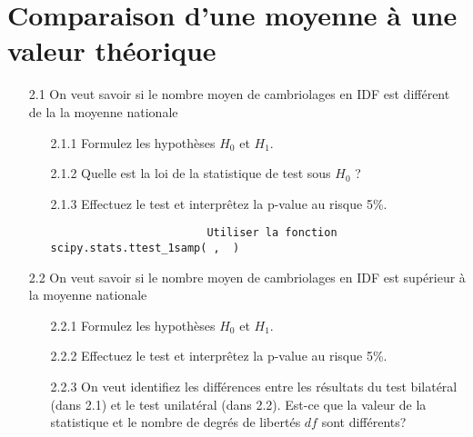 \documentclass[11pt,a4paper]{article}
\begin{document}
		\section{Comparaison d'une moyenne \`a une valeur th\'eorique}
			\begin{enumerate}
				\item[2.1] On veut savoir si le  nombre moyen de  cambriolages en IDF est diff\'erent 
				 de la la moyenne nationale
				
				\begin{itemize}
				\item [2.1.1] Formulez les hypothèses $H_0$ et $H_1$.
				\item [2.1.2] Quelle est la loi de la statistique de test sous $H_0$ ?
				\item [2.1.3] Effectuez le test et interpr\^etez la p-value au risque 5\%.
				\begin{lstlisting}
						Utiliser la fonction scipy.stats.ttest_1samp( ,  )
				\end{lstlisting}
				\end{itemize}
			\item[2.2] On veut savoir si le  nombre moyen de  cambriolages en IDF est sup\'erieur \`a la moyenne 
			nationale
			\begin{itemize}
			\item [2.2.1]Formulez les hypothèses $H_0$ et $H_1$.
		 	\item [2.2.2] Effectuez le test et interpr\^etez la p-value au risque 5\%.
			 \item  [2.2.3] On veut identifiez les diff\'erences entre les r\'esultats du test bilat\'eral (dans 2.1) et le test unilat\'eral (dans 2.2). Est-ce que la valeur de la statistique  et le nombre de degr\'es de libert\'es $df$ sont diff\'erents? 
			 	\end{itemize}
		\end{enumerate}
%		
\end{document}
